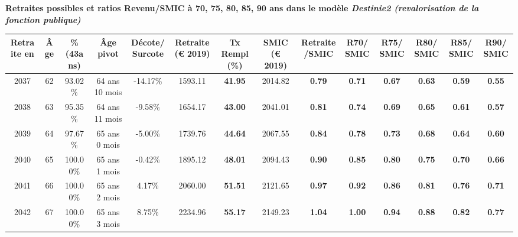  \vspace{0.1cm} 
{\bf \noindent Retraites possibles et ratios Revenu/SMIC à 70, 75, 80, 85, 90 ans dans le modèle \emph{Destinie2 (revalorisation de la fonction publique)}}  
 
\begin{adjustbox}{max width=\textwidth} 
\begin{tabular}[htb]{|c|c||c|c|c||c|c||c|c||c|c|c|c|c|} 
\hline 
 Retraite en &  Âge &  \%(43ans) &  Âge pivot &  Décote/Surcote &  Retraite (\euro{} 2019) &  Tx Rempl(\%) &  SMIC (\euro{} 2019) &  Retraite/SMIC &  R70/SMIC &  R75/SMIC &  R80/SMIC &  R85/SMIC &  R90/SMIC \\ 
\hline \hline 
 2037 &  62 &  93.02\% &  64 ans 10 mois &  -14.17\% &  1593.11 &  {\bf 41.95} &  2014.82 &  {\bf {\color{red} 0.79}} &  {\bf {\color{red} 0.71}} &  {\bf {\color{red} 0.67}} &  {\bf {\color{red} 0.63}} &  {\bf {\color{red} 0.59}} &  {\bf {\color{red} 0.55}} \\ 
\hline 
 2038 &  63 &  95.35\% &  64 ans 11 mois &  -9.58\% &  1654.17 &  {\bf 43.00} &  2041.01 &  {\bf {\color{red} 0.81}} &  {\bf {\color{red} 0.74}} &  {\bf {\color{red} 0.69}} &  {\bf {\color{red} 0.65}} &  {\bf {\color{red} 0.61}} &  {\bf {\color{red} 0.57}} \\ 
\hline 
 2039 &  64 &  97.67\% &  65 ans 0 mois &  -5.00\% &  1739.76 &  {\bf 44.64} &  2067.55 &  {\bf {\color{red} 0.84}} &  {\bf {\color{red} 0.78}} &  {\bf {\color{red} 0.73}} &  {\bf {\color{red} 0.68}} &  {\bf {\color{red} 0.64}} &  {\bf {\color{red} 0.60}} \\ 
\hline 
 2040 &  65 &  100.00\% &  65 ans 1 mois &  -0.42\% &  1895.12 &  {\bf 48.01} &  2094.43 &  {\bf {\color{red} 0.90}} &  {\bf {\color{red} 0.85}} &  {\bf {\color{red} 0.80}} &  {\bf {\color{red} 0.75}} &  {\bf {\color{red} 0.70}} &  {\bf {\color{red} 0.66}} \\ 
\hline 
 2041 &  66 &  100.00\% &  65 ans 2 mois &  4.17\% &  2060.00 &  {\bf 51.51} &  2121.65 &  {\bf {\color{red} 0.97}} &  {\bf {\color{red} 0.92}} &  {\bf {\color{red} 0.86}} &  {\bf {\color{red} 0.81}} &  {\bf {\color{red} 0.76}} &  {\bf {\color{red} 0.71}} \\ 
\hline 
 2042 &  67 &  100.00\% &  65 ans 3 mois &  8.75\% &  2234.96 &  {\bf 55.17} &  2149.23 &  {\bf 1.04} &  {\bf 1.00} &  {\bf {\color{red} 0.94}} &  {\bf {\color{red} 0.88}} &  {\bf {\color{red} 0.82}} &  {\bf {\color{red} 0.77}} \\ 
\hline 
\hline 
\end{tabular} 
\end{adjustbox} 
 

